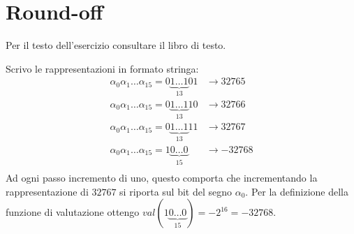 \section{Round-off}

\begin{exercise}[1.5]
Per il testo dell'esercizio consultare il libro di testo.
\end{exercise}
Scrivo le rappresentazioni in formato stringa:
\begin{displaymath}
	\begin{split}
		\alpha_{0}\alpha_{1}\ldots\alpha_{15} = 0\underbrace{1\ldots1}_{13}01 & 
			\rightarrow  32765 \\
		\alpha_{0}\alpha_{1}\ldots\alpha_{15} = 0\underbrace{1\ldots1}_{13}10 & 
			\rightarrow  32766 \\
		\alpha_{0}\alpha_{1}\ldots\alpha_{15} = 0\underbrace{1\ldots1}_{13}11 & 
			\rightarrow  32767 \\
		\alpha_{0}\alpha_{1}\ldots\alpha_{15} = 1\underbrace{0\ldots0}_{15} & 
			\rightarrow  -32768 \\
	\end{split}
\end{displaymath}
Ad ogni passo incremento di uno, questo comporta che incrementando la rappresentazione
di $32767$ si riporta sul bit del segno $\alpha_{0}$. Per la definizione della funzione di 
valutazione ottengo $val(1\underbrace{0\ldots0}_{15}) = -2^{16} = -32768$.

